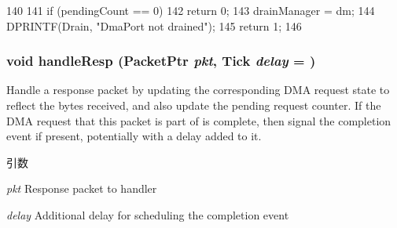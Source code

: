 \begin{DoxyCode}
140 {
141     if (pendingCount == 0)
142         return 0;
143     drainManager = dm;
144     DPRINTF(Drain, "DmaPort not drained\n");
145     return 1;
146 }
\end{DoxyCode}
\hypertarget{classDmaPort_aa7a9b0bb526bd92c0f952a55f875d443}{
\subsubsection[{handleResp}]{\setlength{\rightskip}{0pt plus 5cm}void handleResp ({\bf PacketPtr} {\em pkt}, \/  {\bf Tick} {\em delay} = {})}}
\label{classDmaPort_aa7a9b0bb526bd92c0f952a55f875d443}
Handle a response packet by updating the corresponding DMA request state to reflect the bytes received, and also update the pending request counter. If the DMA request that this packet is part of is complete, then signal the completion event if present, potentially with a delay added to it.


\begin{DoxyParams}{引数}
\item[{\em pkt}]Response packet to handler \item[{\em delay}]Additional delay for scheduling the completion event \end{DoxyParams}



